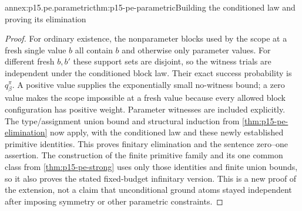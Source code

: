 \begin{annexitem}{annex:p15.pe.parametric}{thm:p15-pe-parametric}{Building the conditioned law and proving its elimination}
\begin{proof}
For ordinary existence, the nonparameter blocks used by the scope
at a fresh single value \(b\) all contain \(b\) and otherwise only
parameter values. For different fresh \(b,b'\) these support sets
are disjoint, so the witness trials are independent under the
conditioned block law. Their exact success probability is
\(q_\beta^\pi\). A positive value supplies the exponentially small
no-witness bound; a zero value makes the scope impossible at a fresh
value because every allowed block configuration has positive weight.
Parameter witnesses are included explicitly. The type/assignment union
bound and structural induction from
\cref{thm:p15-pe-elimination} now apply, with the conditioned law and
these newly established primitive identities. This proves finitary
elimination and the sentence zero--one assertion. The construction of
the finite primitive family and its one common class from
\cref{thm:p15-pe-strong} uses only those identities and finite union
bounds, so it also proves the stated fixed-budget infinitary version.
This is a new proof of the extension, not a claim that unconditional
ground atoms stayed independent after imposing symmetry or other
parametric constraints.
\end{proof}
\end{annexitem}

